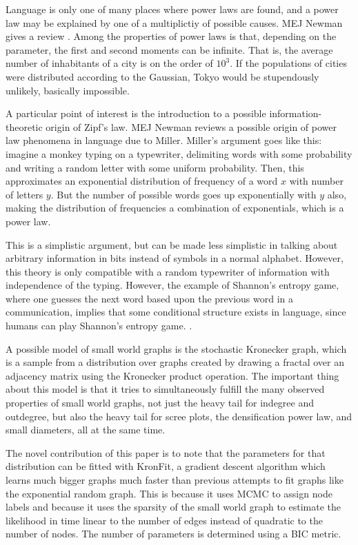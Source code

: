 \documentclass[12pt]{article}
\begin{document}
Language is only one of many places where power laws are found, and a power law may be explained by one of a multiplictiy of possible causes. MEJ Newman gives a review \cite{mejpowerlaw}. Among the properties of power laws is that, depending on the parameter, the first and second moments can be infinite. That is, the average number of inhabitants of a city is on the order of $10^3$. If the populations of cities were distributed according to the Gaussian, Tokyo would be stupendously unlikely, basically impossible.

A particular point of interest is the introduction to a possible information-theoretic origin of Zipf's law. MEJ Newman reviews a possible origin of power law phenomena in language due to Miller\cite{gamiller}. Miller's argument goes like this: imagine a monkey typing on a typewriter, delimiting words with some probability and writing a random letter with some uniform probability. Then, this approximates an exponential distribution of frequency of a word $x$ with number of letters $y$. But the number of possible words goes up exponentially with $y$ also, making the distribution of frequencies a combination of exponentials, which is a power law.

This is a simplistic argument, but can be made less simplistic in talking about arbitrary information in bits instead of symbols in a normal alphabet. However, this theory is only compatible with a random typewriter of information with independence of the typing. However, the example of Shannon's entropy game, where one guesses the next word based upon the previous word in a communication, implies that some conditional structure exists in language, since humans can play Shannon's entropy game. \cite{shannon}
. 

A possible model of small world graphs is the stochastic Kronecker graph\cite{kronfit}, which is a sample from a distribution over graphs created by drawing a fractal over an adjacency matrix using the Kronecker product operation. The important thing about this model is that it tries to simultaneously fulfill the many observed properties of small world graphs, not just the heavy tail for indegree and outdegree, but also the heavy tail for scree plots, the densification power law, and small diameters, all at the same time.

The novel contribution of this paper is to note that the parameters for that distribution can be fitted with KronFit, a gradient descent algorithm which learns much bigger graphs much faster than previous attempts to fit graphs like the exponential random graph. This is because it uses MCMC to assign node labels and because it uses the sparsity of the small world graph to estimate the likelihood in time linear to the number of edges instead of quadratic to the number of nodes. The number of parameters is determined using a BIC metric.
\end{document}
